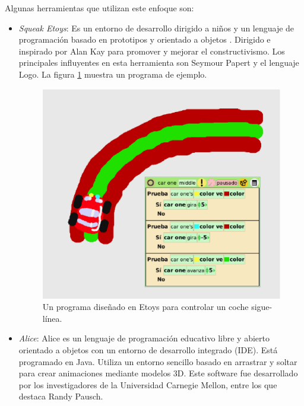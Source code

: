 \documentclass{llncs}
\begin{document}
Algunas herramientas que utilizan este enfoque son:
\begin{itemize}
\item {\em Squeak Etoys}: Es un entorno de desarrollo dirigido a niños y un lenguaje de programación basado en prototipos y orientado a objetos \cite{etoysOnline}. Dirigido e inspirado por Alan Kay para promover y mejorar el constructivismo. Los principales influyentes en esta herramienta son Seymour Papert y el lenguaje Logo. La figura \ref{fig:etoys} muestra un programa de ejemplo.


\begin{figure}[ht]
\begin{center}
\includegraphics[scale=0.4]{images/etoys.eps}
\caption{Un programa diseñado en Etoys para controlar un coche sigue-línea.
\label{fig:etoys}}
\end{center}
\end{figure}

\item {\em Alice}: Alice \cite{AliceOnline} es un lenguaje de programación educativo libre y abierto orientado a objetos con un entorno de desarrollo integrado (IDE). Está programado en Java. Utiliza un entorno sencillo basado en arrastrar y soltar para crear animaciones mediante modelos 3D. Este software fue desarrollado por los investigadores de la Universidad Carnegie Mellon, entre los que destaca Randy Pausch.


\end{itemize}
\end{document}
